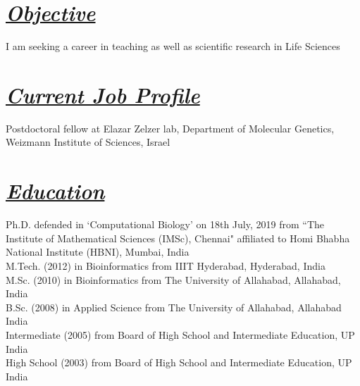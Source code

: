 \documentclass{res}
\begin{document}
 
\begin{resume}

\section{\sl \underline{Objective}}  %
I am seeking a career in teaching as well as scientific research in Life Sciences 

      
\section{\sl \underline{Current Job Profile}}
Postdoctoral fellow at Elazar Zelzer lab, Department of Molecular Genetics, Weizmann Institute of Sciences, Israel 
 
\section{\sl  \underline{Education}}
Ph.D. defended in `Computational Biology' on 18th July, 2019 from ``The  Institute of Mathematical Sciences (IMSc), Chennai" affiliated to Homi Bhabha National Institute (HBNI), Mumbai, India \\    
M.Tech. (2012) in Bioinformatics from IIIT Hyderabad, Hyderabad, India \\
M.Sc. (2010) in Bioinformatics from The University of Allahabad, Allahabad, India \\
B.Sc. (2008) in Applied Science from The University of Allahabad, Allahabad India \\
Intermediate (2005) from Board of High School and Intermediate Education, UP India \\
High School (2003) from Board of High School and Intermediate Education, UP India


\end{resume}
\end{document}
